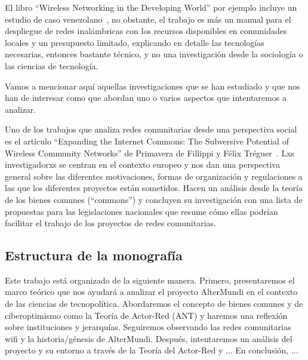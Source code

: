 El libro ``Wireless Networking in the Developing World'' por ejemplo incluye un estudio de caso venezolano~\autocite[437-452]{WNDW2013}, no obstante, el trabajo es más un manual para el despliegue de redes inalámbricas con los recursos disponibles en comunidades locales y un presupuesto limitado, explicando en detalle las tecnologías necesarias, entonces bastante técnico, y no una investigación desde la sociología o las ciencias de tecnología.

Vamos a mencionar aquí aquellas investigaciones que se han estudiado y que nos han de interesar como que abordan uno o varios aspectos que intentaremos a analizar.

Uno de los trabajos que analiza redes comunitarias desde una perspectiva social es el artículo ``Expanding the Internet Commons: The Subversive Potential of Wireless Community Networks'' de Primavera de Fillippi y Félix Tréguer~\autocite{FiTre2015}.
Lxs investigadorxs se centran en el contexto europeo y nos dan una perspectiva general sobre las diferentes motivaciones, formas de organización y regulaciones a las que los diferentes proyectos están sometidos.
Hacen un análisis desde la teoría de los bienes comunes (``commons'') y concluyen su investigación con una lista de propuestas para las legislaciones nacionales que resume cómo ellas podrían facilitar el trabajo de los proyectos de redes comunitarias.

\subsection{Estructura de la monografía}

Este trabajo está organizado de la siguiente manera.
Primero, presentaremos el marco teórico que nos ayudará a analizar el proyecto AlterMundi en el contexto de las ciencias de tecnopolítica.
Abordaremos el concepto de bienes comunes y de ciberoptimismo como la Teoría de Actor-Red (ANT) y haremos una reflexión sobre instituciones y jerarquías.
Seguiremos observando las redes comunitarias wifi y la historia/génesis de AlterMundi.
Después, intentaremos un análisis del proyecto y su entorno a través de la Teoría del Actor-Red y ...
En conclusión, ...

